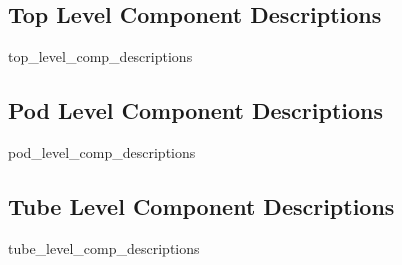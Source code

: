\subsection{Top Level Component Descriptions}
	{top_level_comp_descriptions}
\subsection{Pod Level Component Descriptions}
	{pod_level_comp_descriptions}
\subsection{Tube Level Component Descriptions}
	{tube_level_comp_descriptions}



